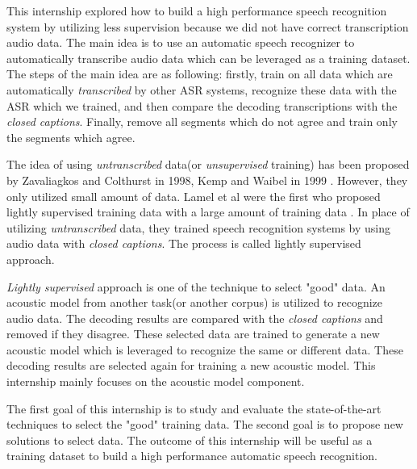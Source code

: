 This internship explored how to build a high performance speech recognition system by utilizing less supervision because we did not have correct transcription audio data. The main idea is to use an automatic speech recognizer to automatically transcribe audio data which can be leveraged as a training dataset.  The steps of the main idea are as following: firstly, train on all data which are automatically \textit{transcribed} by other ASR systems, recognize these data with the ASR which we trained, and then compare the decoding transcriptions with the \textit{closed captions}. Finally, remove all segments which do not agree and train only the segments which agree.

The idea of using \textit{untranscribed} data(or \textit{unsupervised} training) has been proposed by Zavaliagkos and Colthurst in 1998\cite{Zavaliagkos1998UtilizingUT}, Kemp and Waibel in 1999 \cite{Kemp_unsupervisedtraining}. However, they only utilized small amount of data. Lamel et al were the first who proposed lightly supervised training data with a large amount of training data \cite{lightlySupervised}. In place of utilizing \textit{untranscribed} data, they trained  speech recognition systems by using audio data with \textit{closed captions}. The process is called lightly supervised approach.


\textit{Lightly supervised} approach is one of the technique to select "good" data. An acoustic model from another task(or another corpus) is utilized to recognize audio data. The decoding results are compared with the \textit{closed captions} and removed if they disagree. These selected data are trained to generate a new acoustic model which is leveraged to recognize the same or different data. These decoding results are selected again for training a new acoustic model. This internship mainly focuses on the acoustic model component.

 The first goal of this internship is to study and evaluate the state-of-the-art techniques to select the "good" training data. The second goal is to propose new solutions to select data. The outcome of this internship will be useful as a training dataset to build a high performance automatic speech recognition.


